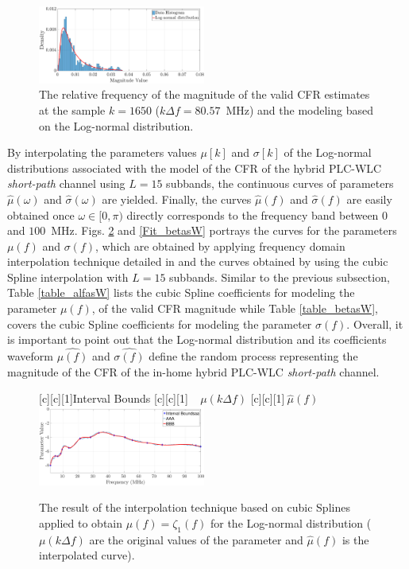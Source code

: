 \documentclass[journal]{IEEEtran}
\begin{document}
\begin{figure}[h!]
	\centering
	\includegraphics[width=0.49\textwidth]{images/Mag_hist2sW_2.eps}
	\caption{ The relative frequency of the magnitude of the valid CFR estimates at the sample $k = 1650$ ($k\Delta f= 80.57$~MHz) and the modeling based on the Log-normal distribution.}
	\label{mag_example2sW}
\end{figure}

By interpolating the parameters values $\mu[k]$ and $\sigma[k]$ of the Log-normal distributions associated with the model of the \ac{CFR} of the hybrid \ac{PLC}-\ac{WLC} \textit{short-path} channel using $L=15$ subbands, the continuous curves of parameters $\hat{\mu}(\omega)$ and $\hat{\sigma}(\omega)$ are yielded. Finally, the curves $\hat{\mu}(f)$ and $\hat{\sigma}(f)$ are easily obtained once $\omega \in [0,\pi)$ directly corresponds to the frequency band between $0$ and $100$~MHz. Figs. \ref{Fit_alfasW} and \ref{Fit_betasW} portrays the curves for the parameters $\mu(f)$ and $\sigma(f)$, which are obtained by applying frequency domain interpolation technique detailed in \cite{mitra} and the curves obtained by using the cubic Spline interpolation with $L=15$ subbands. Similar to the previous subsection, Table \ref{table_alfasW} lists the cubic Spline coefficients for modeling the parameter $\mu(f)$, of the valid \ac{CFR} magnitude while Table \ref{table_betasW}, covers the cubic Spline coefficients for modeling the parameter $\sigma(f)$. Overall, it is important to point out that the Log-normal distribution and its coefficients waveform $\hat{\mu(f)}$ and $\hat{\sigma(f)}$ define the random process representing the magnitude of the \ac{CFR} of the in-home hybrid \ac{PLC}-\ac{WLC} \textit{short-path} channel.

\begin{figure}[h]
	\centering
	[c][1]{Interval Bounds}
	[c][1]{$~~~~~\mu(k \Delta f)$}
	[c][1]{$~\hat{\mu}(f)$}
	\includegraphics[width=0.49\textwidth]{images/Alfa_fitsW.eps}
	\caption{The result of the interpolation technique based on cubic Splines applied to obtain $\mu(f)=\zeta_1(f)$ for the Log-normal distribution (${\mu}(k \Delta f)$ are the original values of the parameter and $\hat{\mu}(f)$ is the interpolated curve).}
	\label{Fit_alfasW}
\end{figure}
\end{document}
